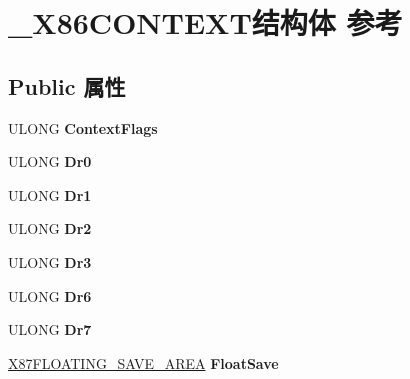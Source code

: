 \hypertarget{struct___x86_c_o_n_t_e_x_t}{}\section{\+\_\+\+X86\+C\+O\+N\+T\+E\+X\+T结构体 参考}
\label{struct___x86_c_o_n_t_e_x_t}
\subsection*{Public 属性}
\begin{DoxyCompactItemize}
\item 
\mbox{\label{struct___x86_c_o_n_t_e_x_t_a36df9b4d9df79e25a15e47c51ad6ebda}} 
U\+L\+O\+NG {\bfseries Context\+Flags}
\item 
\mbox{\label{struct___x86_c_o_n_t_e_x_t_ae9d623800c775b0140720c5dd50aaa3d}} 
U\+L\+O\+NG {\bfseries Dr0}
\item 
\mbox{\label{struct___x86_c_o_n_t_e_x_t_acda29c48890baedeeafd814afcfb91d6}} 
U\+L\+O\+NG {\bfseries Dr1}
\item 
\mbox{\label{struct___x86_c_o_n_t_e_x_t_a2b8219c8f725cc552129d99b4f883d36}} 
U\+L\+O\+NG {\bfseries Dr2}
\item 
\mbox{\label{struct___x86_c_o_n_t_e_x_t_ae2ffa7a639e6f1832ee44ab367031115}} 
U\+L\+O\+NG {\bfseries Dr3}
\item 
\mbox{\label{struct___x86_c_o_n_t_e_x_t_a14842677bd0c784ea54af122bd29905e}} 
U\+L\+O\+NG {\bfseries Dr6}
\item 
\mbox{\label{struct___x86_c_o_n_t_e_x_t_a5671bd3895f10e77b69e1514c49b2900}} 
U\+L\+O\+NG {\bfseries Dr7}
\item 
\mbox{\label{struct___x86_c_o_n_t_e_x_t_a7b67101ba4b3d4e435680b5539fd7193}} 
\hyperlink{struct___x87_f_l_o_a_t_i_n_g___s_a_v_e___a_r_e_a}{X87\+F\+L\+O\+A\+T\+I\+N\+G\+\_\+\+S\+A\+V\+E\+\_\+\+A\+R\+EA} {\bfseries Float\+Save}
\item 

\end{DoxyCompactItemize}
